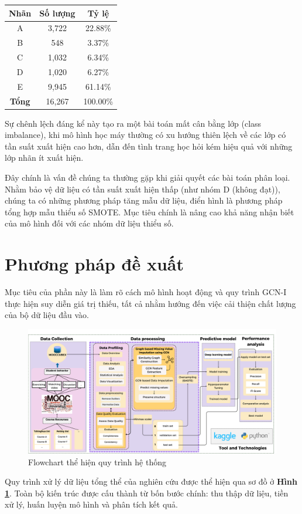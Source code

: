 \begin{table}[htbp]
\begin{minipage}[t]{0.32\textwidth}
\begin{tabular}{|c|c|c|}
\hline
\textbf{Nhãn} & \textbf{Số lượng} & \textbf{Tỷ lệ} \\
\hline
A  & 3,722 & 22.88\% \\
B  & 548 & 3.37\% \\
C  & 1,032 & 6.34\% \\
D  & 1,020 & 6.27\% \\
E  & 9,945 & 61.14\% \\
\hline
\textbf{Tổng} & 16,267 & 100.00\% \\
\hline
\end{tabular}
\end{minipage}
\end{table}
Sự chênh lệch đáng kể này tạo ra một bài toán mất cân bằng lớp (class imbalance), khi mô hình học máy thường có xu hướng thiên lệch về các lớp có tần suất xuất hiện cao hơn, dẫn đến tình trang học hỏi kém hiệu quả với những lớp nhãn ít xuất hiện.

Đây chính là vấn đề chúng ta thường gặp khi giải quyết các bài toán phân loại. Nhằm bảo vệ dữ liệu có tần suất xuất hiện thấp (như nhóm D (không đạt)), chúng ta có những phương pháp tăng mẫu dữ liệu, điển hình là phương pháp tổng hợp mẫu thiểu số SMOTE. Mục tiêu chính là nâng cao khả năng nhận biết của mô hình đối với các nhóm dữ liệu thiểu số.
\section{Phương pháp đề xuất}
Mục tiêu của phần này là làm rõ cách mô hình hoạt động và quy trình GCN-I thực hiện suy diễn giá trị thiếu, tất cả nhằm hướng đến việc cải thiện chất lượng của bộ dữ liệu đầu vào.

\begin{figure}[t]
    \centering
    \includegraphics[width = \textwidth]{imgs/system-logo.png}
    \caption{Flowchart thể hiện quy trình hệ thống}
    \label{fig:System-img}
\end{figure}
  Quy trình xử lý dữ liệu tổng thể của nghiên cứu được thể hiện qua sơ đồ ở \textbf{Hình \ref{fig:System-img}}. Toàn bộ kiến trúc được cấu thành từ bốn bước chính: thu thập dữ liệu, tiền xử lý, huấn luyện mô hình và phân tích kết quả. 

